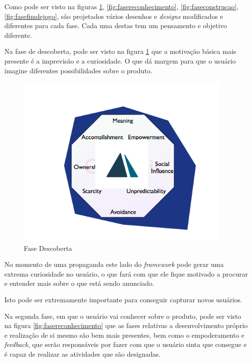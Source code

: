 Como pode ser visto na figuras \ref{fig:fasedescoberta}, \ref{fig:fasereconhecimento}, \ref{fig:faseconstrucao}, 
\ref{fig:fasefimdejogo}, são projetados vários
desenhos e \textit{designs} modificados e diferentes para cada fase. Cada uma destas
tem um pensamento e objetivo diferente.

Na fase de descoberta, pode ser visto na figura \ref{fig:fasedescoberta} que a motivação básica mais presente é
a imprevisão e a curiosidade. O que dá margem para que o usuário imagine diferentes
possibilidades sobre o produto. 

\begin{figure}[h]
    \centering
    \includegraphics[width=400px, scale=1]{figuras/fasedescoberta}
    \caption{Fase Descoberta}
    \label{fig:fasedescoberta}
\end{figure}

No momento de uma propaganda este lado do \textit{framework} pode gerar uma
extrema curiosidade no usuário, o que fará com que ele fique motivado a procurar
e entender mais sobre o que está sendo anunciado.

Isto pode ser extremamente importante para conseguir capturar novos usuários.

Na segunda fase, em que o usuário vai conhecer sobre o produto, pode ser visto
na figura \ref{fig:fasereconhecimento} que as fases relativas a desenvolvimento próprio e realização de si mesmo
são bem mais presentes, bem como o empoderamento e \textit{feedback}, que serão
responsáveis por fazer com que o usuário sinta que consegue e é capaz
de realizar as atividades que são designadas.

